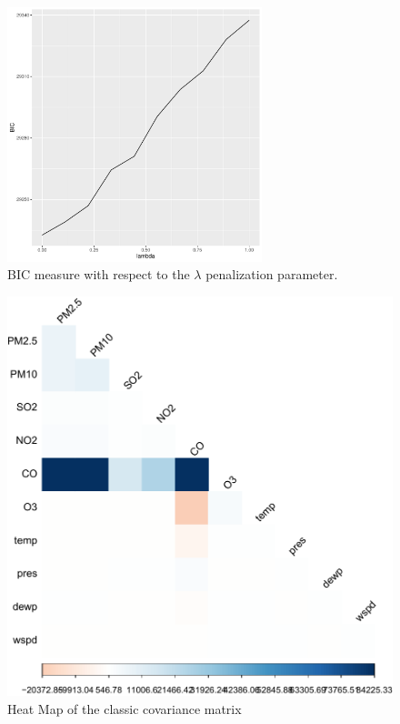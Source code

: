 \documentclass[a4paper, 12pt]{article}
\begin{document}
    \begin{figure}[H]
        \centering
        \includegraphics[width=0.66\textwidth]{resources/pdf/optimal_lambda.pdf}
        \caption{BIC measure with respect to the $\lambda$ penalization parameter.}
        \label{fig:optimal_lambda}
    \end{figure}
    
    \begin{figure}[H]
        \centering
        \includegraphics[width = 0.6 \textwidth]{resources/pdf/covariance_plot.pdf}
        \caption{Heat Map of the classic covariance matrix}
        \label{fig:covariance_plot}
    \end{figure}
        
\end{document}
